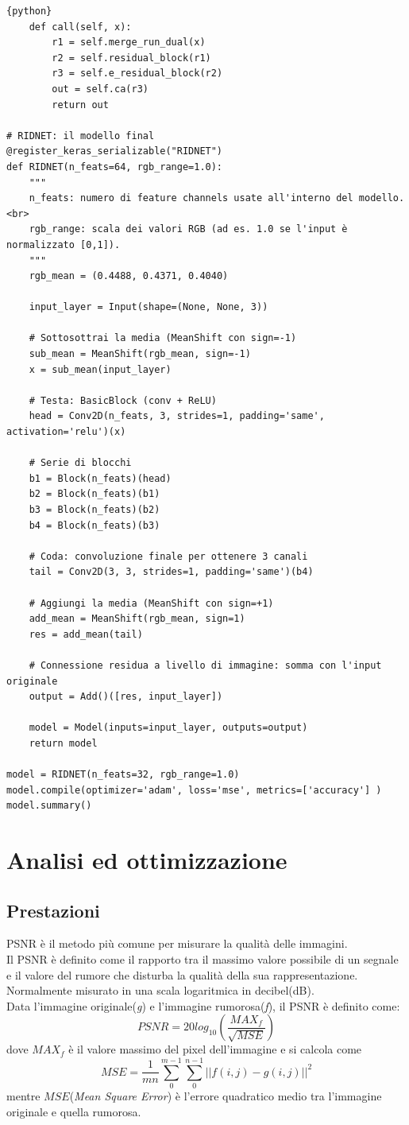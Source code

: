 \documentclass[12pt,a4paper,openright,twoside]{book}
\begin{document}
\begin{lstlisting}{python}
    def call(self, x):
        r1 = self.merge_run_dual(x)
        r2 = self.residual_block(r1)
        r3 = self.e_residual_block(r2)
        out = self.ca(r3)
        return out

# RIDNET: il modello final
@register_keras_serializable("RIDNET")
def RIDNET(n_feats=64, rgb_range=1.0):
    """
    n_feats: numero di feature channels usate all'interno del modello.<br>
    rgb_range: scala dei valori RGB (ad es. 1.0 se l'input è normalizzato [0,1]).
    """
    rgb_mean = (0.4488, 0.4371, 0.4040)

    input_layer = Input(shape=(None, None, 3))

    # Sottosottrai la media (MeanShift con sign=-1)
    sub_mean = MeanShift(rgb_mean, sign=-1)
    x = sub_mean(input_layer)

    # Testa: BasicBlock (conv + ReLU)
    head = Conv2D(n_feats, 3, strides=1, padding='same', activation='relu')(x)

    # Serie di blocchi
    b1 = Block(n_feats)(head)
    b2 = Block(n_feats)(b1)
    b3 = Block(n_feats)(b2)
    b4 = Block(n_feats)(b3)

    # Coda: convoluzione finale per ottenere 3 canali
    tail = Conv2D(3, 3, strides=1, padding='same')(b4)

    # Aggiungi la media (MeanShift con sign=+1)
    add_mean = MeanShift(rgb_mean, sign=1)
    res = add_mean(tail)

    # Connessione residua a livello di immagine: somma con l'input originale
    output = Add()([res, input_layer])

    model = Model(inputs=input_layer, outputs=output)
    return model

model = RIDNET(n_feats=32, rgb_range=1.0)
model.compile(optimizer='adam', loss='mse', metrics=['accuracy'] )
model.summary()

\end{lstlisting}

\chapter{Analisi ed ottimizzazione}
\section{Prestazioni}
PSNR è il metodo più comune per misurare la qualità delle immagini.\\
Il PSNR è definito come il rapporto tra il massimo valore possibile di un segnale e il valore del rumore che disturba la qualità della sua rappresentazione.\\ Normalmente misurato in una scala logaritmica in decibel(dB).\\
Data l'immagine originale(\textit{g}) e l'immagine rumorosa(\textit{f}), il PSNR è definito come: \[PSNR=20log_{10}(\frac{MAX_f}{\sqrt{MSE}})\] dove $MAX_f$ è il valore massimo del pixel dell'immagine e si calcola come \[MSE=\frac{1}{mn}\sum_{0}^{m-1}\sum_{0}^{n-1}||f(i,j)-g(i,j)||^2  \] mentre $MSE$(\textit{Mean Square Error}) è l'errore quadratico medio tra l'immagine originale e quella rumorosa.\\
\end{document}
